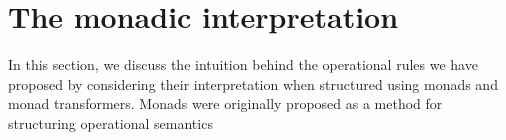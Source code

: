 \section{The monadic interpretation}
\label{sec:monad}

In this section, we discuss the intuition behind the operational rules
we have proposed by considering their interpretation when structured
using monads and monad transformers.  Monads were originally proposed
as a method for structuring operational semantics~\cite{Moggi:2007:SOS:1230168.1230592}
